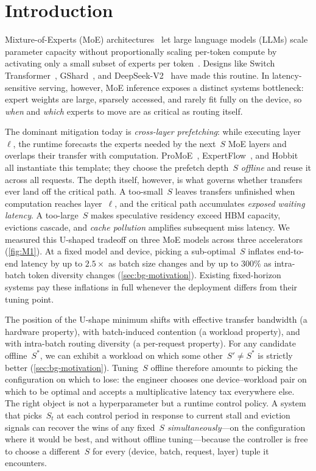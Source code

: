 \section{Introduction}
\label{sec:intro}

Mixture-of-Experts (MoE) architectures~\cite{jiang2024mixtral,masoudnia2014mixture,wang2025hmoe} let large language models (LLMs) scale parameter capacity without proportionally scaling per-token compute by activating only a small subset of experts per token~\cite{shazeer2017outrageously}. Designs like Switch Transformer~\cite{fedus2022switch}, GShard~\cite{lepikhin2020gshard}, and DeepSeek-V2~\cite{deepseekai2024deepseekv2strongeconomicalefficient} have made this routine. In latency-sensitive serving, however, MoE inference exposes a distinct systems bottleneck: expert weights are large, sparsely accessed, and rarely fit fully on the device, so \emph{when} and \emph{which} experts to move are as critical as routing itself.

The dominant mitigation today is \emph{cross-layer prefetching}: while executing layer~$\ell$, the runtime forecasts the experts needed by the next~$S$ MoE layers and overlaps their transfer with computation. ProMoE~\cite{song2024promoe}, ExpertFlow~\cite{he2024expertflow}, and Hobbit~\cite{tang2024hobbit} all instantiate this template; they choose the prefetch depth~$S$ \emph{offline} and reuse it across all requests. The depth itself, however, is what governs whether transfers ever land off the critical path. A too-small~$S$ leaves transfers unfinished when computation reaches layer~$\ell$, and the critical path accumulates \emph{exposed waiting latency}. A too-large~$S$ makes speculative residency exceed HBM capacity, evictions cascade, and \emph{cache pollution} amplifies subsequent miss latency. We measured this U-shaped tradeoff on three MoE models across three accelerators (\autoref{fig:M1}). At a fixed model and device, picking a sub-optimal~$S$ inflates end-to-end latency by up to $2.5\times$ as batch size changes and by up to $300\%$ as intra-batch token diversity changes (\autoref{sec:bg-motivation}). Existing fixed-horizon systems pay these inflations in full whenever the deployment differs from their tuning point.

The position of the U-shape minimum shifts with effective transfer bandwidth (a hardware property), with batch-induced contention (a workload property), and with intra-batch routing diversity (a per-request property). For any candidate offline~$S^*$, we can exhibit a workload on which some other~$S'\neq S^*$ is strictly better (\autoref{sec:bg-motivation}). Tuning~$S$ offline therefore amounts to picking the configuration on which to lose: the engineer chooses one device--workload pair on which to be optimal and accepts a multiplicative latency tax everywhere else. The right object is not a hyperparameter but a runtime control policy. A system that picks~$S_t$ at each control period in response to current stall and eviction signals can recover the wins of any fixed~$S$ \emph{simultaneously}---on the configuration where it would be best, and without offline tuning---because the controller is free to choose a different~$S$ for every (device, batch, request, layer) tuple it encounters.

